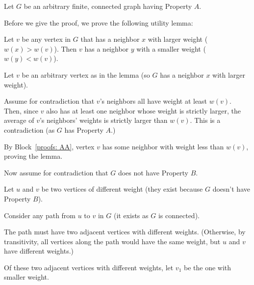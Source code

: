 \begin{longFormProof}
  \step
  Let $G$ be an arbitrary finite, connected graph having Property $A$.

  \step  Before we give the proof, we prove the following utility lemma:

  \begin{lemma}\label{proofs: lemma: high low}
    Let $v$ be any vertex in $G$ that has a neighbor $x$ with larger weight ($w(x) > w(v)$).
    Then $v$ has a neighbor $y$ with a smaller weight ($w(y) < w(v)$).
  \end{lemma}
  \begin{longFormSubProof}

  \step Let $v$ be an arbitrary vertex as in the lemma
  (so $G$ has a neighbor $x$ with larger weight).

  \begin{block}[proofs: AA]
    \step Assume for contradiction that $v$'s neighbors all have weight at least $w(v)$.
     Then, since $v$ also has at least one neighbor whose weight is strictly larger,
    the average of $v$'s neighbors' weights is strictly larger than $w(v)$.
    \step This is a contradiction (as $G$ has Property $A$.)
  \end{block}

  \step By Block~\ref{proofs: AA}, vertex $v$ has some neighbor with weight less than $w(v)$,
  proving the lemma.
  \vspace*{-1em}
\end{longFormSubProof}


  \begin{block}[proofs: A]
    \step Now assume for contradiction that $G$ does not have Property $B$.
    
    \step Let $u$ and $v$ be two vertices of different weight (they exist because $G$ doesn't have Property $B$).

    \step Consider any path from $u$ to $v$ in $G$ (it exists as $G$ is connected).

    \step The path must have two adjacent vertices with different weights.
    (Otherwise, by transitivity, all vertices along the path would have the same weight,
    but $u$ and $v$ have different weights.)

    \step Of these two adjacent vertices with different weights, let $v_1$ be the one with smaller weight.


\end{block}
\end{longFormProof}
